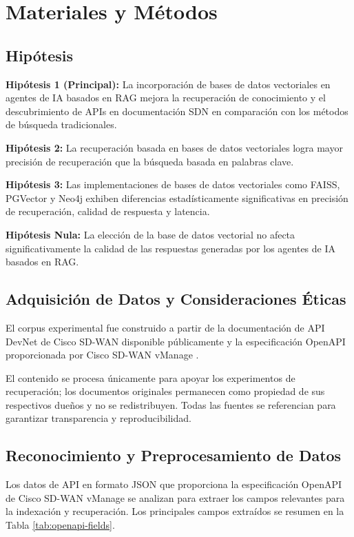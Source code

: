 \documentclass[11pt, a4paper]{article}
\begin{document}

\section{Materiales y Métodos}
\label{sec:Materials_and_Methods}
\subsection{Hipótesis}

\noindent\textbf{Hipótesis 1 (Principal):}
La incorporación de bases de datos vectoriales en agentes de IA basados en RAG mejora la recuperación de conocimiento y el descubrimiento de APIs en documentación SDN en comparación con los métodos de búsqueda tradicionales.

\noindent\textbf{Hipótesis 2:}
La recuperación basada en bases de datos vectoriales logra mayor precisión de recuperación que la búsqueda basada en palabras clave.

\noindent\textbf{Hipótesis 3:}
Las implementaciones de bases de datos vectoriales como FAISS, PGVector y Neo4j exhiben diferencias estadísticamente significativas en precisión de recuperación, calidad de respuesta y latencia.

\noindent\textbf{Hipótesis Nula:}
La elección de la base de datos vectorial no afecta significativamente la calidad de las respuestas generadas por los agentes de IA basados en RAG.\\

\subsection{Adquisición de Datos y Consideraciones Éticas}

El corpus experimental fue construido a partir de la documentación de API DevNet de Cisco SD-WAN disponible públicamente \parencite{cisco_sdwan_docs} y la especificación OpenAPI proporcionada por Cisco SD-WAN vManage \parencite{cisco_vmanage_openapi}.

El contenido se procesa únicamente para apoyar los experimentos de recuperación; los documentos originales permanecen como propiedad de sus respectivos dueños y no se redistribuyen. Todas las fuentes se referencian para garantizar transparencia y reproducibilidad.

\subsection{Reconocimiento y Preprocesamiento de Datos}
Los datos de API en formato JSON que proporciona la especificación OpenAPI de Cisco SD-WAN vManage \parencite{cisco_vmanage_openapi} se analizan para extraer los campos relevantes para la indexación y recuperación. Los principales campos extraídos se resumen en la Tabla \ref{tab:openapi-fields}.
\end{document}
